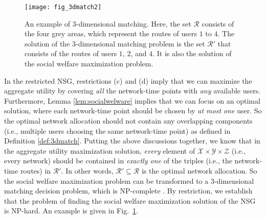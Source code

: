 \documentclass[journal]{IEEEtran}
\begin{document}
\begin{figure}[t]
 \centering
   \texttt{[image: fig\_3dmatch2]} 
 \caption{An example of 3-dimensional matching. Here, the set $\mathcal{R}$ consists of the four grey areas, which represent the routes of users $1$ to $4$. The solution of the 3-dimensional matching problem is the set $\mathcal{R}'$ that consists of the routes of users $1$, $2$, and $4$. It is also the solution of the social welfare maximization problem.}
\label{fig:3dmatch}
\end{figure}

	
	
	In the restricted NSG, restrictions (c) and (d) imply that we can maximize the aggregate utility by covering \emph{all} the network-time points with \emph{any} available users. 
  Furthermore, Lemma \ref{lem:socialwelware} implies that we can focus on an optimal solution, where each network-time point should be chosen by \emph{at most one} user.
 So the optimal network allocation should not contain any overlapping components (i.e., multiple users choosing the same network-time point) as defined in Definition \ref{def:3dmatch}. %
	Putting the above discussions together, we know that in the aggregate utility maximization solution, \emph{every} element of $\mathcal{X} \times \mathcal{Y} \times \mathcal{Z}$ (i.e., every network) should be contained in \emph{exactly one} of the triples (i.e., the network-time routes) in $\mathcal{R}'$. 
	In other words, $\mathcal{R}' \subseteq \mathcal{R}$ is the optimal network allocation. So the social welfare maximization problem can be transformed to a 3-dimensional matching decision problem, which is NP-complete \cite{garey_ca79, kleinberg_ad05}. %
	By restriction, we establish that the problem of finding the social welfare maximization solution of the NSG is NP-hard.  
	An example is given in Fig.~\ref{fig:3dmatch}. \hfill \IEEEQED %
\end{document}
